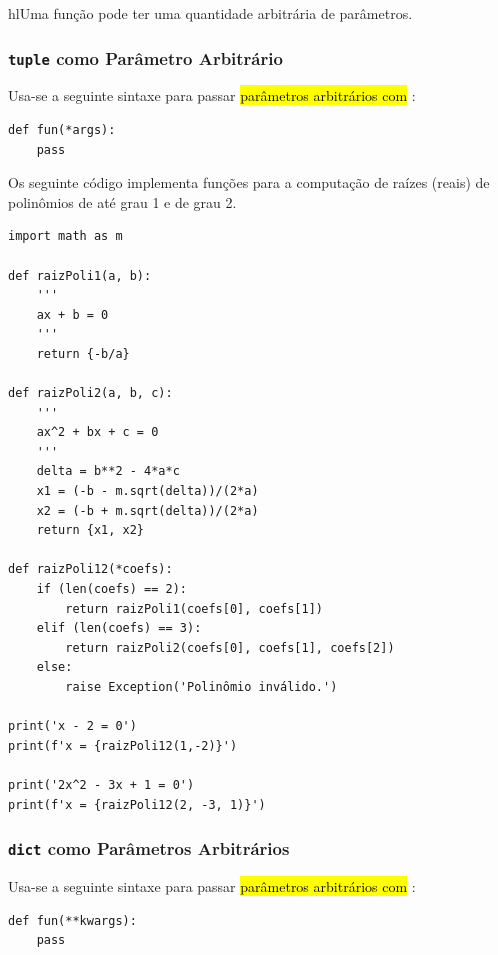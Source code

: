 hl{Uma função pode ter uma quantidade arbitrária de parâmetros}.

\subsubsection{\texttt{tuple} como Parâmetro Arbitrário}

Usa-se a seguinte sintaxe para passar \hl{parâmetros arbitrários com {\PYTHONtuple}}:

\begin{lstlisting}
def fun(*args):
    pass
\end{lstlisting}

\begin{ex}
  Os seguinte código implementa funções para a computação de raízes (reais) de polinômios de até grau 1 e de grau 2.

\begin{lstlisting}
import math as m

def raizPoli1(a, b):
    '''
    ax + b = 0
    '''
    return {-b/a}

def raizPoli2(a, b, c):
    '''
    ax^2 + bx + c = 0
    '''
    delta = b**2 - 4*a*c
    x1 = (-b - m.sqrt(delta))/(2*a)
    x2 = (-b + m.sqrt(delta))/(2*a)
    return {x1, x2}

def raizPoli12(*coefs):
    if (len(coefs) == 2):
        return raizPoli1(coefs[0], coefs[1])
    elif (len(coefs) == 3):
        return raizPoli2(coefs[0], coefs[1], coefs[2])
    else:
        raise Exception('Polinômio inválido.')

print('x - 2 = 0')
print(f'x = {raizPoli12(1,-2)}')

print('2x^2 - 3x + 1 = 0')
print(f'x = {raizPoli12(2, -3, 1)}')
\end{lstlisting}

\end{ex}

\subsubsection{\texttt{dict} como Parâmetros Arbitrários}

Usa-se a seguinte sintaxe para passar \hl{parâmetros arbitrários com {\PYTHONdict}}:

\begin{lstlisting}
def fun(**kwargs):
    pass
\end{lstlisting}


